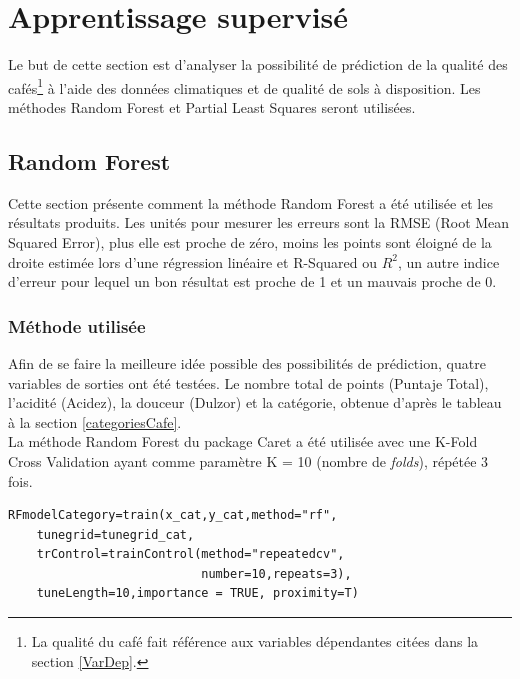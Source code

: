 








\newpage

\section{Apprentissage supervisé}
Le but de cette section est d'analyser la possibilité de prédiction de la qualité des cafés\footnote{La qualité du café fait référence aux variables dépendantes citées dans la section \ref{VarDep}.} à l'aide des données climatiques et de qualité de sols à disposition. Les méthodes Random Forest et Partial Least Squares seront utilisées.


\subsection{Random Forest}
 
Cette section présente comment la méthode Random Forest a été utilisée et les résultats produits. Les unités pour mesurer les erreurs sont la RMSE (Root Mean Squared Error), plus elle est proche de zéro, moins les points sont éloigné de la droite estimée lors d'une régression linéaire et R-Squared ou $R^2$, un autre indice d'erreur pour lequel un bon résultat est proche de 1 et un mauvais proche de 0. 
\subsubsection{Méthode utilisée}
Afin de se faire la meilleure idée possible des possibilités de prédiction, quatre variables de sorties ont été testées. Le nombre total de points (Puntaje Total), l'acidité (Acidez), la douceur (Dulzor) et la catégorie, obtenue d'après le tableau à la section \ref{categoriesCafe}. \\

\noindent La méthode Random Forest du package Caret a été utilisée avec une K-Fold Cross Validation ayant comme paramètre K = 10 (nombre de \textit{folds}), répétée 3 fois. 

\begin{lstlisting}[caption={Fonction d'entrainement et de test du modèle avec Random Forest},captionpos=b]
	RFmodelCategory=train(x_cat,y_cat,method="rf",
	tunegrid=tunegrid_cat,
	trControl=trainControl(method="repeatedcv",
	                       number=10,repeats=3),
	tuneLength=10,importance = TRUE, proximity=T)
\end{lstlisting}




